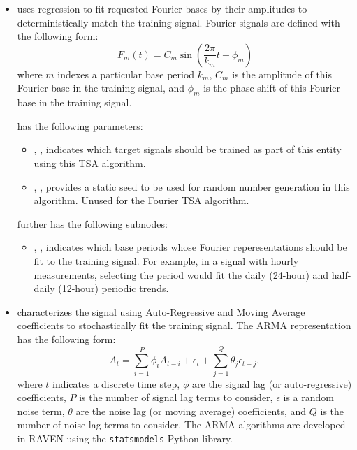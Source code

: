 {\begin{itemize}
   has the following subnodes:
  \begin{itemize}
  \item {}, , indicates which
    degree of polynomial to fit to the presented data.
  \end{itemize}

  \item {} uses regression to fit requested Fourier bases by their amplitudes to
    deterministically match the training signal. Fourier signals are defined with the following form:
    \begin{equation*}
      F_m(t) = C_m\sin\left( \frac{2\pi}{k_m}t + \phi_m\right)
    \end{equation*}
    where $m$ indexes a particular base period $k_m$, $C_m$ is the amplitude of this Fourier base in the
    training signal, and $\phi_m$ is the phase shift of this Fourier base in the training signal.

     has the following parameters:
    \begin{itemize}
      \item {}, , indicates which
        target signals should be trained as part of this entity using this TSA algorithm.
      \item {}, , provides a static seed to be used for
        random number generation in this algorithm. Unused for the Fourier TSA algorithm.
    \end{itemize}
     further has the following subnodes:
    \begin{itemize}
      \item {}, , indicates which base
        periods whose Fourier reperesentations should be fit to the training signal. For example, in
        a signal with hourly measurements, selecting the period  would fit the daily
        (24-hour) and half-daily (12-hour) periodic trends.
    \end{itemize}

  \item {} characterizes the signal using Auto-Regressive and Moving Average
    coefficients to stochastically fit the training signal.
    The ARMA representation has the following form:
    \begin{equation*}
      A_t = \sum_{i=1}^P \phi_i A_{t-i} + \epsilon_t + \sum_{j=1}^Q \theta_j \epsilon_{t-j},
    \end{equation*}
    where $t$ indicates a discrete time step, $\phi$ are the signal lag (or auto-regressive)
    coefficients, $P$ is the number of signal lag terms to consider, $\epsilon$ is a random noise
    term, $\theta$ are the noise lag (or moving average) coefficients, and $Q$ is the number of
    noise lag terms to consider. The ARMA algorithms are developed in RAVEN using the
    \texttt{statsmodels} Python library.


\end{itemize}}
